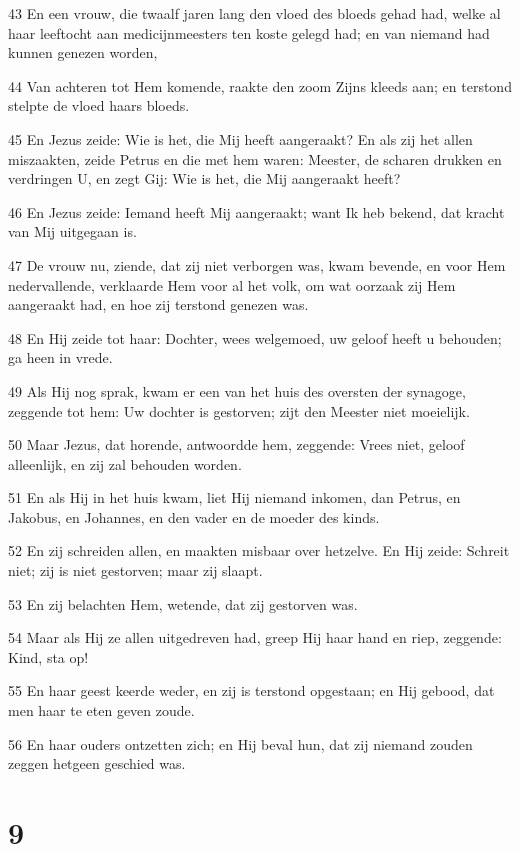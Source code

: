 \par 43 En een vrouw, die twaalf jaren lang den vloed des bloeds gehad had, welke al haar leeftocht aan medicijnmeesters ten koste gelegd had; en van niemand had kunnen genezen worden,
\par 44 Van achteren tot Hem komende, raakte den zoom Zijns kleeds aan; en terstond stelpte de vloed haars bloeds.
\par 45 En Jezus zeide: Wie is het, die Mij heeft aangeraakt? En als zij het allen miszaakten, zeide Petrus en die met hem waren: Meester, de scharen drukken en verdringen U, en zegt Gij: Wie is het, die Mij aangeraakt heeft?
\par 46 En Jezus zeide: Iemand heeft Mij aangeraakt; want Ik heb bekend, dat kracht van Mij uitgegaan is.
\par 47 De vrouw nu, ziende, dat zij niet verborgen was, kwam bevende, en voor Hem nedervallende, verklaarde Hem voor al het volk, om wat oorzaak zij Hem aangeraakt had, en hoe zij terstond genezen was.
\par 48 En Hij zeide tot haar: Dochter, wees welgemoed, uw geloof heeft u behouden; ga heen in vrede.
\par 49 Als Hij nog sprak, kwam er een van het huis des oversten der synagoge, zeggende tot hem: Uw dochter is gestorven; zijt den Meester niet moeielijk.
\par 50 Maar Jezus, dat horende, antwoordde hem, zeggende: Vrees niet, geloof alleenlijk, en zij zal behouden worden.
\par 51 En als Hij in het huis kwam, liet Hij niemand inkomen, dan Petrus, en Jakobus, en Johannes, en den vader en de moeder des kinds.
\par 52 En zij schreiden allen, en maakten misbaar over hetzelve. En Hij zeide: Schreit niet; zij is niet gestorven; maar zij slaapt.
\par 53 En zij belachten Hem, wetende, dat zij gestorven was.
\par 54 Maar als Hij ze allen uitgedreven had, greep Hij haar hand en riep, zeggende: Kind, sta op!
\par 55 En haar geest keerde weder, en zij is terstond opgestaan; en Hij gebood, dat men haar te eten geven zoude.
\par 56 En haar ouders ontzetten zich; en Hij beval hun, dat zij niemand zouden zeggen hetgeen geschied was.

\chapter{9}

